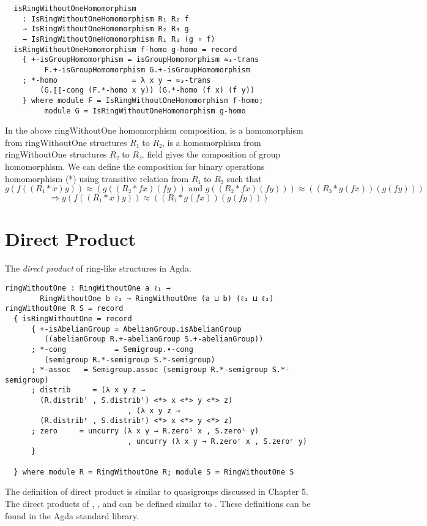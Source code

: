 \begin{verbatim}
  isRingWithoutOneHomomorphism
    : IsRingWithoutOneHomomorphism R₁ R₂ f
    → IsRingWithoutOneHomomorphism R₂ R₃ g
    → IsRingWithoutOneHomomorphism R₁ R₃ (g ∘ f)
  isRingWithoutOneHomomorphism f-homo g-homo = record
    { +-isGroupHomomorphism = isGroupHomomorphism ≈₃-trans
		 F.+-isGroupHomomorphism G.+-isGroupHomomorphism
    ; *-homo                 = λ x y → ≈₃-trans 
		(G.⟦⟧-cong (F.*-homo x y)) (G.*-homo (f x) (f y))
    } where module F = IsRingWithoutOneHomomorphism f-homo;
		 module G = IsRingWithoutOneHomomorphism g-homo
\end{verbatim}
In the above ringWithoutOne homomorphism composition,  is a
homomorphism from ringWithoutOne structures $R₁$ to $R₂$,  is a
homomorphism from ringWithoutOne structures $R₂$ to $R₃$.
 field gives the composition of group homomorphism.
We can define the composition for binary operations homomorphism (*) using
transitive relation  from $R₁$ to $R₃$ such that \[g (f ((R₁ * x)
y)) ≈ (g ((R₂ * f x) (f y)) \text{ and } g ((R₂ * f x) (f y))) ≈ ((R₃ * g (f x))
(g (f y)))\]
\[\Rightarrow g (f ((R₁ * x) y)) ≈ ((R₃ * g (f x)) (g (f y)))\]
\section{Direct Product}
The \textit{direct product} of ring-like structures in Agda.

\begin{verbatim}
ringWithoutOne : RingWithoutOne a ℓ₁ → 
		RingWithoutOne b ℓ₂ → RingWithoutOne (a ⊔ b) (ℓ₁ ⊔ ℓ₂)
ringWithoutOne R S = record
  { isRingWithoutOne = record
      { +-isAbelianGroup = AbelianGroup.isAbelianGroup
		 ((abelianGroup R.+-abelianGroup S.+-abelianGroup))
      ; *-cong           = Semigroup.∙-cong
		 (semigroup R.*-semigroup S.*-semigroup)
      ; *-assoc   = Semigroup.assoc (semigroup R.*-semigroup S.*-semigroup)
      ; distrib     = (λ x y z → 
		(R.distribˡ , S.distribˡ) <*> x <*> y <*> z)
                            , (λ x y z → 
		(R.distribʳ , S.distribʳ) <*> x <*> y <*> z)
      ; zero     = uncurry (λ x y → R.zeroˡ x , S.zeroˡ y)
                            , uncurry (λ x y → R.zeroʳ x , S.zeroʳ y)
      }

  } where module R = RingWithoutOne R; module S = RingWithoutOne S
\end{verbatim}

The definition of direct product is similar to quasigroups discussed in Chapter
5. The direct products of , , and
 can be defined similar to . These
definitions can be found in the Agda standard library.


